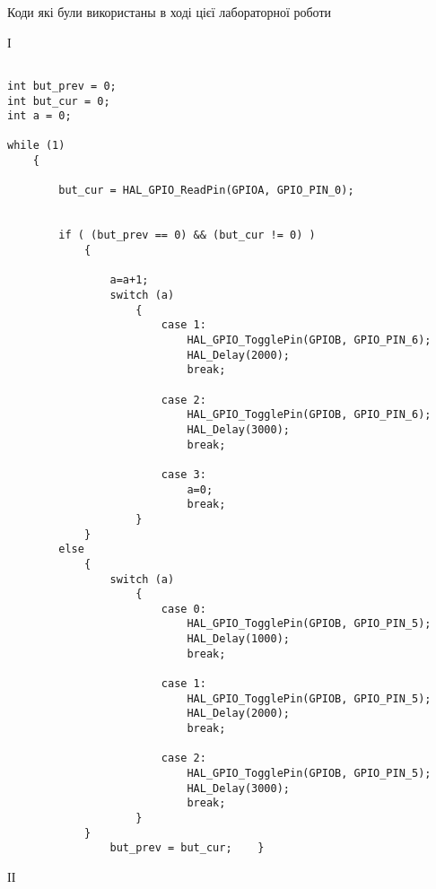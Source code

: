 \documentclass[a4paper,14pt]{extreport}
\begin{document}
\begin{center}  Коди які були використаны в ході цієї лабораторної роботи\end{center}



\begin{center}  І\end{center}



\begin{verbatim}

int but_prev = 0;
int but_cur = 0;
int a = 0;

while (1)
    {
        
        but_cur = HAL_GPIO_ReadPin(GPIOA, GPIO_PIN_0);
        

        if ( (but_prev == 0) && (but_cur != 0) )
            {    

                a=a+1;
                switch (a)
                    {
                        case 1:
                            HAL_GPIO_TogglePin(GPIOB, GPIO_PIN_6);
                            HAL_Delay(2000);
                            break;

                        case 2:
                            HAL_GPIO_TogglePin(GPIOB, GPIO_PIN_6);
                            HAL_Delay(3000);
                            break;

                        case 3:
                            a=0;
                            break;
                    }
            }
        else
            {      
                switch (a)
                    {
                        case 0:
                            HAL_GPIO_TogglePin(GPIOB, GPIO_PIN_5);
                            HAL_Delay(1000);
                            break;

                        case 1:
                            HAL_GPIO_TogglePin(GPIOB, GPIO_PIN_5);
                            HAL_Delay(2000);
                            break;

                        case 2:
                            HAL_GPIO_TogglePin(GPIOB, GPIO_PIN_5);
                            HAL_Delay(3000);                            
                            break;
                    }
            }
                but_prev = but_cur;    }
\end{verbatim}


\begin{center}  ІІ\end{center}
\end{document}
